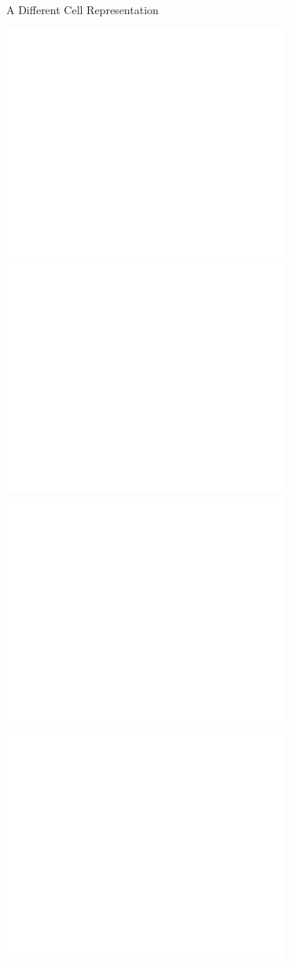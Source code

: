 \documentclass{beamer}
\begin{document}
\begin{frame}{A Different Cell Representation}
\begin{overprint}
 \includegraphics[width=0.7\textwidth]{bitcell1}
 \includegraphics[width=0.7\textwidth]{bitcell2}
 \includegraphics[width=0.7\textwidth]{bitcell3}
 \includegraphics[width=0.7\textwidth]{bitcell4}

\end{overprint}
\end{frame}
\end{document}
